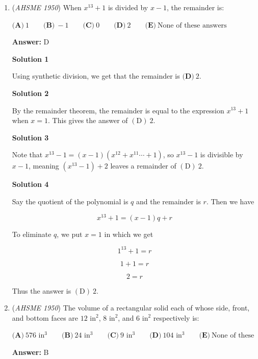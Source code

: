 \begin{enumerate}
 


	\item (\textit{AHSME 1950}) When $x^{13}+1$ is divided by $x-1$, the remainder is:


 $\textbf{(A)}\ 1\qquad\textbf{(B)}\ -1\qquad\textbf{(C)}\ 0\qquad\textbf{(D)}\ 2\qquad\textbf{(E)}\ \text{None of these answers}$

 \textbf{Answer: }D



\textbf{Solution 1}

Using synthetic division, we get that the remainder is $\boxed{\textbf{(D)}\ 2}$.

 



\textbf{Solution 2}

By the remainder theorem, the remainder is equal to the expression $x^{13}+1$ when $x=1.$ This gives the answer of $\boxed{(\mathrm{D})\ 2.}$




\textbf{Solution 3}

Note that $x^{13} - 1 = (x - 1)(x^{12} + x^{11} \cdots + 1)$, so $x^{13} - 1$ is divisible by $x-1$, meaning $(x^{13} - 1) + 2$ leaves a remainder of $\boxed{\mathrm{(D)}\ 2.}$




\textbf{Solution 4}

Say the quotient of the polynomial is \( q \) and the remainder is \( r \). Then we have

 
 \[x^{13} + 1 = (x - 1)q + r\]

 To eliminate \( q \), we put \( x = 1 \) in which we get

 
 \[1^{13} + 1 = r\]

 \[1 + 1 = r\]

 \[2 = r\]

 Thus the answer is $\boxed{(\mathrm{D})\ 2.}$



	\item (\textit{AHSME 1950}) The volume of a rectangular solid each of whose side, front, and bottom faces are $12\text{ in}^{2}$, $8\text{ in}^{2}$, and $6\text{ in}^{2}$ respectively is:


 $\textbf{(A)}\ 576\text{ in}^{3}\qquad\textbf{(B)}\ 24\text{ in}^{3}\qquad\textbf{(C)}\ 9\text{ in}^{3}\qquad\textbf{(D)}\ 104\text{ in}^{3}\qquad\textbf{(E)}\ \text{None of these}$

 \textbf{Answer: }B




\end{enumerate}
